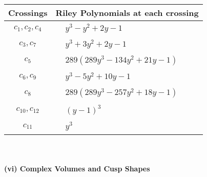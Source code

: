 \documentclass[1p]{elsarticle_modified}
\theoremstyle{definition}
\begin{document}
\begin{tabular}{m{50pt}|m{274pt}}
Crossings & \hspace{64pt}Riley Polynomials at each crossing \\
\hline $$\begin{aligned}c_{1},c_{2},c_{4}\end{aligned}$$&$\begin{aligned}
&y^3- y^2+2 y-1
\end{aligned}$\\
\hline $$\begin{aligned}c_{3},c_{7}\end{aligned}$$&$\begin{aligned}
&y^3+3 y^2+2 y-1
\end{aligned}$\\
\hline $$\begin{aligned}c_{5}\end{aligned}$$&$\begin{aligned}
&289(289 y^3-134 y^2+21 y-1)
\end{aligned}$\\
\hline $$\begin{aligned}c_{6},c_{9}\end{aligned}$$&$\begin{aligned}
&y^3-5 y^2+10 y-1
\end{aligned}$\\
\hline $$\begin{aligned}c_{8}\end{aligned}$$&$\begin{aligned}
&289(289 y^3-257 y^2+18 y-1)
\end{aligned}$\\
\hline $$\begin{aligned}c_{10},c_{12}\end{aligned}$$&$\begin{aligned}
&(y-1)^3
\end{aligned}$\\
\hline $$\begin{aligned}c_{11}\end{aligned}$$&$\begin{aligned}
&y^3
\end{aligned}$\\
\hline
\end{tabular}\\~\\
\newpage\flushleft \textbf{(vi) Complex Volumes and Cusp Shapes}
\end{document}
